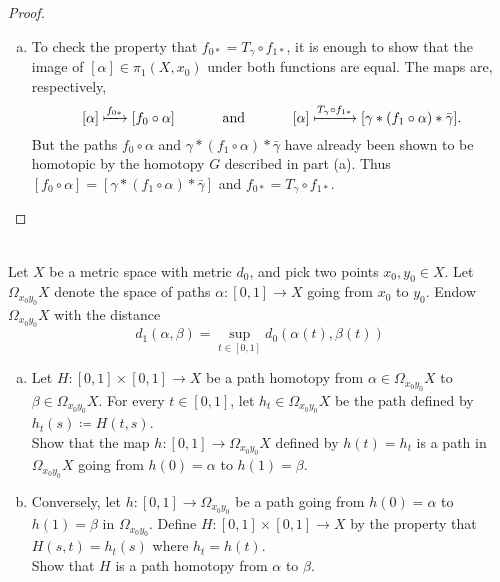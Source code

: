 \documentclass{article}
\newenvironment{problem}[2][Problem]{\begin{trivlist}
\item[\hskip \labelsep {\bfseries #1}\hskip \labelsep {\bfseries #2.}]}{\end{trivlist}}
\begin{document}
\begin{proof}
\begin{enumerate}[(a)]
\begin{enumerate}[(i)]
  \end{enumerate}
  \item To check the property that $f_{0*} = T_\gamma \circ f_{1*}$, it is
  enough to show that the image of $[\alpha] \in \pi_1(X, x_0)$ under both
  functions are equal. The maps are, respectively, \[
    [\alpha] \xmapsto{f_{0*}} [f_0 \circ \alpha]
    \hspace{1.2cm}\text{and}\hspace{1.2cm}
    [\alpha] \xmapsto{T_\gamma \circ f_{1*}} [\gamma * (f_1 \circ \alpha) * \bar\gamma].
  \]
  But the paths $f_0 \circ \alpha$ and $\gamma * (f_1 \circ \alpha) * \bar\gamma$
  have already been shown to be homotopic by the homotopy $G$ described in part
  (a). Thus $[f_0 \circ \alpha] = [\gamma * (f_1 \circ \alpha) * \bar\gamma]$
  and $f_{0*} = T_\gamma \circ f_{1*}$.
\end{enumerate}
\end{proof}
\pagebreak
\begin{problem}{2} \text{} \\
  Let $X$ be a metric space with metric $d_0$, and pick two points
  $x_0, y_0 \in X$. Let $\Omega_{x_0y_0}X$ denote the space of paths
  $\alpha\colon[0,1]\rightarrow X$ going from $x_0$ to $y_0$. Endow
  $\Omega_{x_0y_0}X$ with the distance \[
    d_1(\alpha, \beta) = \sup_{t\in[0,1]} d_0(\alpha(t), \beta(t))
  \]
  \begin{enumerate}[a.]
    \item Let $H\colon[0,1]\times[0,1]\rightarrow X$ be a path homotopy from
    $\alpha \in \Omega_{x_0y_0}X$ to $\beta \in \Omega_{x_0y_0}X$. For every
    $t \in [0,1]$, let $h_t \in \Omega_{x_0y_0}X$ be the path defined by
    $h_t(s) \coloneqq H(t, s)$.
    \\
    Show that the map $h\colon[0,1]\rightarrow\Omega_{x_0y_0}X$ defined by
    $h(t) = h_t$ is a path in  $\Omega_{x_0y_0}X$ going from $h(0) = \alpha$ to
    $ h(1) = \beta$.
    \item Conversely, let $h\colon[0,1]\rightarrow\Omega_{x_0y_0}$ be a path going
    from $h(0)=\alpha$ to $h(1)=\beta$ in $\Omega_{x_0y_0}$. Define
    $H\colon[0,1]\times[0,1]\rightarrow X$ by the property that $H(s,t)=h_t(s)$
    where $h_t = h(t)$.
    \\
    Show that $H$ is a path homotopy from $\alpha$ to $\beta$.
  \end{enumerate}
\end{problem}
\end{document}
